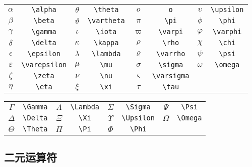 \begin{table}[H]
\centering
\begin{tabular}{*{8}{c}}
$\alpha$ & \verb|\alpha| & $\theta$ & \verb|\theta| & $o$ & \verb|o| & $\upsilon $& \verb|\upsilon| \\
$\beta$ & \verb|\beta| & $\vartheta$ & \verb|\vartheta| & $\pi$ & \verb|\pi| & $\phi$ & \verb|\phi| \\
$\gamma$ & \verb|\gamma| & $\iota$ & \verb|\iota| & $\varpi $& \verb|\varpi| & $\varphi $& \verb|\varphi| \\
$\delta$ & \verb|\delta| & $\kappa$ & \verb|\kappa| & $\rho $& \verb|\rho| & $\chi $& \verb|\chi| \\
$\epsilon$ & \verb|\epsilon| & $\lambda$ & \verb|\lambda| & $\varrho$ & \verb|\varrho| &$ \psi $& \verb|\psi| \\
$\varepsilon$ & \verb|\varepsilon| & $\mu$ & \verb|\mu| & $\sigma$ & \verb|\sigma| & $\omega$ & \verb|\omega| \\
$\zeta$ & \verb|\zeta| & $\nu$ & \verb|\nu| & $\varsigma$ & \verb|\varsigma| &  &  \\
$\eta$ & \verb|\eta| & $\xi$ & \verb|\xi| & $\tau$ & \verb|\tau| &  &  \\

\end{tabular}
\end{table}

\begin{table}[H]
\centering
\begin{tabular}{*{8}{c}}
$\Gamma $ & \verb|\Gamma| &  $ \Lambda$ & \verb|\Lambda| & $\Sigma $ & \verb|\Sigma| &  $\Psi $ & \verb|\Psi| \\
$\Delta $ & \verb|\Delta| &  $\Xi $ & \verb|\Xi| &  $\Upsilon $ & \verb|\Upsilon| &  $ \Omega$ & \verb|\Omega| \\
$\Theta $ & \verb|\Theta| &  $\Pi $ & \verb|\Pi| &  $ \Phi$ & \verb|\Phi| &  $ $ &  \\
\end{tabular}
\end{table}



\subsection{二元运算符}


